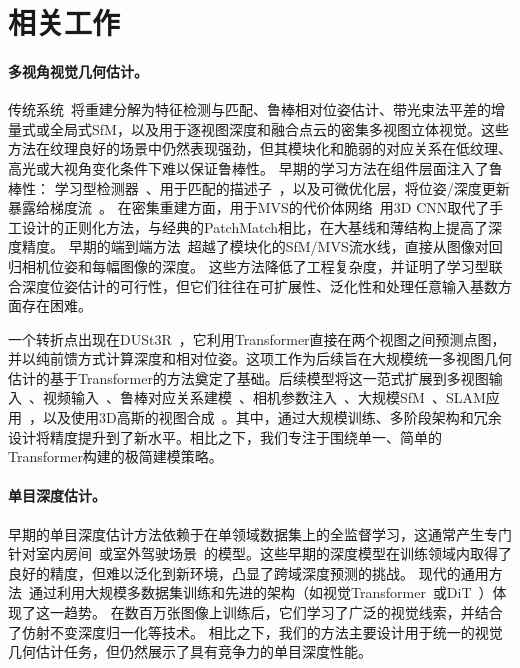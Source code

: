 \section{相关工作}


\paragraph{多视角视觉几何估计。}
传统系统~\citep{schoenberger2016sfm, schoenberger2016mvs}将重建分解为特征检测与匹配、鲁棒相对位姿估计、带光束法平差的增量式或全局式SfM，以及用于逐视图深度和融合点云的密集多视图立体视觉。这些方法在纹理良好的场景中仍然表现强劲，但其模块化和脆弱的对应关系在低纹理、高光或大视角变化条件下难以保证鲁棒性。
早期的学习方法在组件层面注入了鲁棒性：
学习型检测器~\citep{detone2018superpoint}、用于匹配的描述子~\citep{dusmanu2019d2}，以及可微优化层，将位姿/深度更新暴露给梯度流~\citep{he2024detector,guo2025multi,pan2024global}。
在密集重建方面，用于MVS的代价体网络~\citep{yao2018mvsnet,xu2023iterative}用3D CNN取代了手工设计的正则化方法，与经典的PatchMatch相比，在大基线和薄结构上提高了深度精度。
早期的端到端方法~\citep{teed2018deepv2d,wang2024vggsfm}超越了模块化的SfM/MVS流水线，直接从图像对回归相机位姿和每幅图像的深度。
这些方法降低了工程复杂度，并证明了学习型联合深度位姿估计的可行性，但它们往往在可扩展性、泛化性和处理任意输入基数方面存在困难。

一个转折点出现在DUSt3R~\citep{dust3r}，它利用Transformer直接在两个视图之间预测点图，并以纯前馈方式计算深度和相对位姿。这项工作为后续旨在大规模统一多视图几何估计的基于Transformer的方法奠定了基础。后续模型将这一范式扩展到多视图输入~\citep{fast3r,cut3r,Mv-dust3r+,must3r}、视频输入~\citep{monst3r,cut3r,murai2025mast3r,deng2025vggtlong}、鲁棒对应关系建模~\citep{mast3r}、相机参数注入~\citep{jang2025pow3r,keetha2025mapanything}、大规模SfM~\citep{deng2025sailrecon}、SLAM应用~\citep{maggio2025vggtslam}，以及使用3D高斯的视图合成~\citep{flare,smart2024splatt3r,charatan2024pixelsplat,chen2024mvsplat,jiang2025anysplat,xu2025depthsplat}。其中，\cite{wang2025vggt}通过大规模训练、多阶段架构和冗余设计将精度提升到了新水平。相比之下，我们专注于围绕单一、简单的Transformer构建的极简建模策略。

\paragraph{单目深度估计。}
早期的单目深度估计方法依赖于在单领域数据集上的全监督学习，这通常产生专门针对室内房间~\citep{silberman2012indoor}或室外驾驶场景~\citep{geiger2013vision}的模型。这些早期的深度模型在训练领域内取得了良好的精度，但难以泛化到新环境，凸显了跨域深度预测的挑战。
现代的通用方法~\citep{yang2024depth,yang2024depthv2,wang2025moge,bochkovskii2024depth,yin2023metric3d,ke2024repurposing}通过利用大规模多数据集训练和先进的架构（如视觉Transformer~\citep{ranftl2021vision}或DiT~\citep{peebles2023scalable}）体现了这一趋势。
在数百万张图像上训练后，它们学习了广泛的视觉线索，并结合了仿射不变深度归一化等技术。
相比之下，我们的方法主要设计用于统一的视觉几何估计任务，但仍然展示了具有竞争力的单目深度性能。



